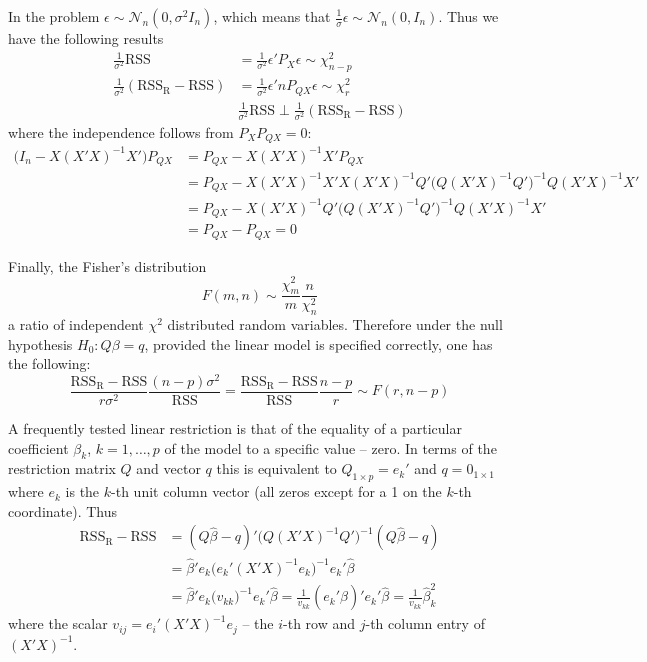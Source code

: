 \documentclass[a4paper]{article}
\newcommand{\R}{\text{R}}
\newcommand{\RSS}{\text{RSS}}
\begin{document}
In the problem $\epsilon\sim\mathcal{N}_n(0,\sigma^2 I_n)$, which means that $\frac{1}{\sigma} \epsilon \sim \mathcal{N}_n(0,I_n)$. Thus we have the following results
\begin{align*}
	\frac{1}{\sigma^2}\RSS &= \frac{1}{\sigma^2}\epsilon'P_X \epsilon \sim \chi^2_{n-p} \\
	\frac{1}{\sigma^2}(\RSS_\R - \RSS) &= \frac{1}{\sigma^2}\epsilon'n P_{QX} \epsilon \sim \chi^2_r \\
	& \frac{1}{\sigma^2}\RSS \perp \frac{1}{\sigma^2}(\RSS_\R - \RSS)
\end{align*}
where the independence follows from $P_X P_{QX} = 0$:
\begin{align*}
	\big(I_n - X(X'X)^{-1}X'\big) P_{QX} &= P_{QX} - X(X'X)^{-1}X' P_{QX} \\
	&= P_{QX} - X(X'X)^{-1}X'X(X'X)^{-1}Q'\big(Q(X'X)^{-1}Q'\big)^{-1}Q(X'X)^{-1}X' \\
	&= P_{QX} - X(X'X)^{-1}Q'\big(Q(X'X)^{-1}Q'\big)^{-1}Q(X'X)^{-1}X' \\
	&= P_{QX} - P_{QX} = 0
\end{align*}

Finally, the Fisher's distribution 
\[F(m,n) \sim \frac{\chi^2_m}{m} \frac{n}{\chi^2_n}\]
a ratio of independent $\chi^2$ distributed random variables. Therefore under the null hypothesis $H_0: Q\beta = q$, provided the linear model is specified correctly, one has the following:
\[\frac{\RSS_\R - \RSS}{r \sigma^2}\frac{(n-p) \sigma^2}{\RSS} = \frac{\RSS_\R - \RSS}{\RSS}\frac{n-p}{r}\sim F(r,n-p)\]

A frequently tested linear restriction is that of the equality of a particular coefficient $\beta_k$, $k=1,\ldots,p$ of the model to a specific value -- zero. In terms of the restriction matrix $Q$ and vector $q$ this is equivalent to $Q_{1\times p} = e_k'$ and $q=0_{1\times 1}$ where $e_k$ is the $k$-th unit column vector (all zeros except for a 1 on the $k$-th coordinate). Thus
\begin{align*}
	\RSS_\R - \RSS
	&= (Q\hat{\beta}-q)'\big(Q(X'X)^{-1}Q'\big)^{-1}(Q\hat{\beta}-q) \\
	&= \hat{\beta}'e_k\big(e_k'(X'X)^{-1}e_k\big)^{-1}e_k'\hat{\beta} \\
	&= \hat{\beta}'e_k\big(v_{kk}\big)^{-1}e_k'\hat{\beta} = \frac{1}{v_{kk}}(e_k'\hat{\beta})' e_k'\hat{\beta} = \frac{1}{v_{kk}}\hat{\beta}_k^2
\end{align*}
where the scalar $v_{ij} = e_i'(X'X)^{-1}e_j$ -- the $i$-th row and $j$-th column entry of $(X'X)^{-1}$.
\end{document}
